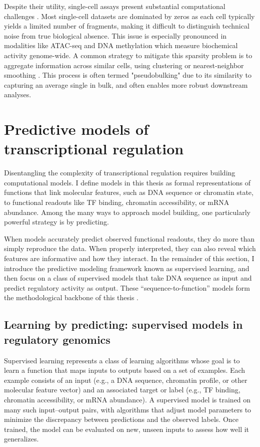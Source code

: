 \begin{dissertationintroduction}
Despite their utility, single-cell assays present substantial computational challenges \cite{Heumos2023-hq,Kharchenko2021-ba}. Most single-cell datasets are dominated by zeros as each cell typically yields a limited number of fragments, making it difficult to distinguish technical noise from true biological absence. This issue is especially pronounced in modalities like ATAC-seq and DNA methylation which measure biochemical activity genome-wide. A common strategy to mitigate this sparsity problem is to aggregate information across similar cells, using clustering or nearest-neighbor smoothing \cite{Kiselev2019-ky}. This process is often termed "pseudobulking" due to its similarity to capturing an average single in bulk, and often enables more robust downstream analyses.

\section{Predictive models of transcriptional regulation}

Disentangling the complexity of transcriptional regulation requires building computational models. I define models in this thesis as formal representations of functions that link molecular features, such as DNA sequence or chromatin state, to functional readouts like TF binding, chromatin accessibility, or mRNA abundance. Among the many ways to approach model building, one particularly powerful strategy is by predicting.

When models accurately predict observed functional readouts, they do more than simply reproduce the data. When properly interpreted, they can also reveal which features are informative and how they interact. In the remainder of this section, I introduce the predictive modeling framework known as supervised learning, and then focus on a class of supervised models that take DNA sequence as input and predict regulatory activity as output. These “sequence-to-function” models form the methodological backbone of this thesis \cite{Sasse2024-ly}.

\subsection{Learning by predicting: supervised models in regulatory genomics}

Supervised learning represents a class of learning algorithms whose goal is to learn a function that maps inputs to outputs based on a set of examples. Each example consists of an input (e.g., a DNA sequence, chromatin profile, or other molecular feature vector) and an associated target or label (e.g., TF binding, chromatin accessibility, or mRNA abundance). A supervised model is trained on many such input–output pairs, with algorithms that adjust model parameters to minimize the discrepancy between predictions and the observed labels. Once trained, the model can be evaluated on new, unseen inputs to assess how well it generalizes.


\end{dissertationintroduction}
